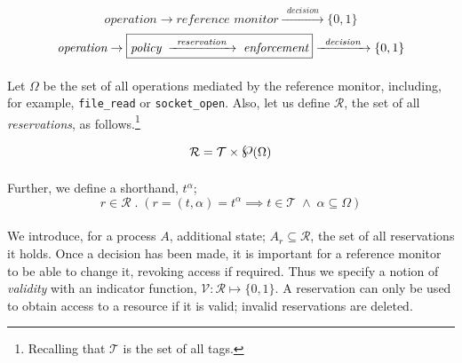 \begin{equation}\label{eqn:res-1}
    \textit{operation} \rightarrow \boxed{\textit{reference monitor}} \xrightarrow{\;\;\textit{decision}\;\;} \{0,1\}
\end{equation}
\vspace{-3mm}
\begin{equation}\label{eqn:res-2}
    \textit{operation} \rightarrow \boxed{\textit{policy}\; \xrightarrow{\;\;\textit{reservation}\;\;} \;\textit{enforcement}} \xrightarrow{\;\;\textit{decision}\;\;} \{0,1\}
    \vspace{3mm}
\end{equation}


\paragraph{} Let $\Omega$ be the set of all operations mediated by the reference monitor, including, for example, \texttt{file\_read} or \texttt{socket\_open}. Also, let us define $\mathcal{R}$, the set of all \textit{reservations}, as follows.\footnote{Recalling that $\mathcal{T}$ is the set of all tags.}

\newcommand{\powerset}{\raisebox{.15\baselineskip}{\Large\ensuremath{\wp}}}
\vspace{-7mm}
\begin{equation*}
    \mathcal{R} = \mathcal{T} \times \powerset(\Omega)
    \vspace{2mm}
\end{equation*}

\paragraph{} Further, we define a shorthand, $t^{\alpha}$;
\vspace{-3mm}
\begin{equation*}
    r \in \mathcal{R} \;.\; (r = (t, \alpha) = t^{\alpha} \implies t \in \mathcal{T} \; \wedge \; \alpha \subseteq \Omega)
\end{equation*}

\paragraph{} We introduce, for a process $A$, additional state; $A_{r} \subseteq \mathcal{R}$, the set of all reservations it holds. Once a decision has been made, it is important for a reference monitor to be able to change it, revoking access if required. Thus we specify a notion of \textit{validity} with an indicator function, $\mathcal{V}: \mathcal{R} \mapsto \{0,1\}$. A reservation can only be used to obtain access to a resource if it is valid; invalid reservations are deleted.

